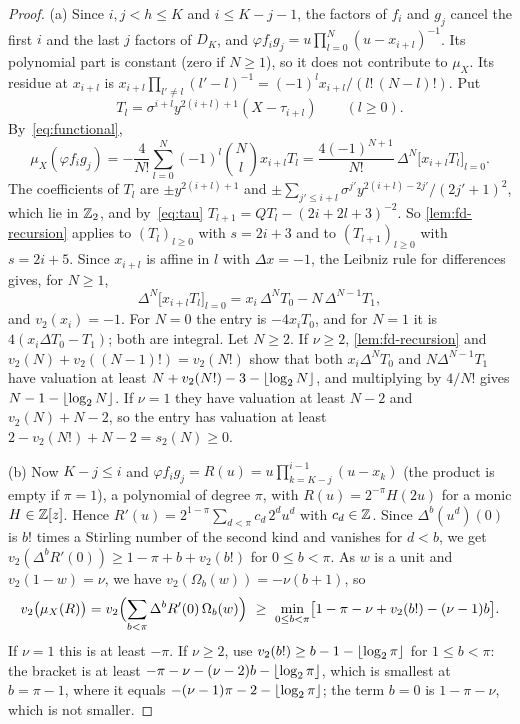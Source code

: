 \begin{proof}
(a) Since $i,j<h\le K$ and $i\le K-j-1$, the factors of $f_i$ and $g_j$ cancel the first $i$
and the last $j$ factors of $D_K$, and $\varphi f_ig_j=u\prod_{l=0}^{N}(u-x_{i+l})^{-1}$. Its
polynomial part is constant (zero if $N\ge1$), so it does not contribute to $\mu_X$. Its residue
at $x_{i+l}$ is $x_{i+l}\prod_{l'\ne l}(l'-l)^{-1}=(-1)^lx_{i+l}/(l!\,(N-l)!)$. Put
\[
  T_l=\sigma^{i+l}y^{2(i+l)+1}(X-\tau_{i+l})\qquad(l\ge0).
\]
By~\eqref{eq:functional},
\begin{equation}\label{eq:entry-fd}
  \mu_X(\varphi f_ig_j)=-\frac4{N!}\sum_{l=0}^{N}(-1)^l\binom Nlx_{i+l}T_l
  =\frac{4(-1)^{N+1}}{N!}\,\Delta^N\bigl[x_{i+l}T_l\bigr]_{l=0}.
\end{equation}
The coefficients of $T_l$ are $\pm y^{2(i+l)+1}$ and
$\pm\sum_{j'\le i+l}\sigma^{j'}y^{2(i+l)-2j'}/(2j'+1)^2$, which lie in $\mathbb{Z}_2$, and
by~\eqref{eq:tau} $T_{l+1}=QT_l-(2i+2l+3)^{-2}$. So \cref{lem:fd-recursion} applies to
$(T_l)_{l\ge0}$ with $s=2i+3$ and to $(T_{l+1})_{l\ge0}$ with $s=2i+5$. Since $x_{i+l}$ is
affine in $l$ with $\Delta x=-1$, the Leibniz rule for differences gives, for $N\ge1$,
\[
  \Delta^N\bigl[x_{i+l}T_l\bigr]_{l=0}=x_i\,\Delta^NT_0-N\,\Delta^{N-1}T_1,
\]
and $v_2(x_i)=-1$. For $N=0$ the entry is $-4x_iT_0$, and for $N=1$ it is $4(x_i\Delta T_0-T_1)$;
both are integral. Let $N\ge2$. If $\nu\ge2$, \cref{lem:fd-recursion} and
$v_2(N)+v_2((N-1)!)=v_2(N!)$ show that both $x_i\Delta^NT_0$ and $N\Delta^{N-1}T_1$ have
valuation at least $N+v_2(N!)-3-\left\lfloor \log_2N\right\rfloor$, and multiplying by $4/N!$ gives
$N-1-\left\lfloor \log_2N\right\rfloor$. If $\nu=1$ they have valuation at least $N-2$ and $v_2(N)+N-2$, so the
entry has valuation at least $2-v_2(N!)+N-2=s_2(N)\ge0$.

(b) Now $K-j\le i$ and $\varphi f_ig_j=R(u)=u\prod_{k=K-j}^{i-1}(u-x_k)$ (the product is empty
if $\pi=1$), a polynomial of degree $\pi$, with $R(u)=2^{-\pi}H(2u)$ for a monic $H\in\mathbb{Z}[z]$. Hence
$R'(u)=2^{1-\pi}\sum_{d<\pi}c_d\,2^du^d$ with $c_d\in\mathbb{Z}$. Since $\Delta^b(u^d)(0)$ is $b!$ times
a Stirling number of the second kind and vanishes for $d<b$, we get
$v_2(\Delta^bR'(0))\ge1-\pi+b+v_2(b!)$ for $0\le b<\pi$. As $w$ is a unit and $v_2(1-w)=\nu$, we
have $v_2(\Omega_b(w))=-\nu(b+1)$, so
\[
  v_2\bigl(\mu_X(R)\bigr)=v_2\Bigl(\sum_{b<\pi}\Delta^bR'(0)\,\Omega_b(w)\Bigr)\ \ge\
  \min_{0\le b<\pi}\bigl[1-\pi-\nu+v_2(b!)-(\nu-1)b\bigr].
\]
If $\nu=1$ this is at least $-\pi$. If $\nu\ge2$, use $v_2(b!)\ge b-1-\left\lfloor \log_2\pi\right\rfloor$ for
$1\le b<\pi$: the bracket is at least $-\pi-\nu-(\nu-2)b-\left\lfloor \log_2\pi\right\rfloor$, which is smallest
at $b=\pi-1$, where it equals $-(\nu-1)\pi-2-\left\lfloor \log_2\pi\right\rfloor$; the term $b=0$ is $1-\pi-\nu$,
which is not smaller.
\end{proof}

